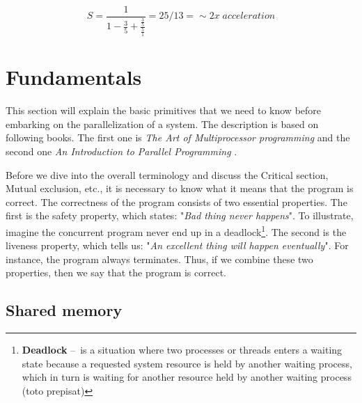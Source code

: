 \begin{equation}
    \label{eqn:amdalhinpractice}
    S = \frac{1}{1 - \frac{3}{5} + \frac{\frac{3}{5}}{\frac{5}{1}}} = 25/13 =\sim 2x \; acceleration
    \tag{2}
\end{equation}

\section{Fundamentals}

This section will explain the basic primitives that we need to know before embarking on the parallelization of a system. The description is based on following books. The first one is \emph{The Art of Multiprocessor programming} \cite{artOfMultiprocessorProgramming} and the second one \emph{An Introduction to Parallel Programming} \cite{introductionToParallelProgramming}.

Before we dive into the overall terminology and discuss the Critical section, Mutual exclusion, etc., it is necessary to know what it means that the program is correct. The correctness of the program consists of two essential properties. The first is the safety property, which states: "\emph{Bad thing never happens}". To illustrate, imagine the concurrent program never end up in a deadlock\footnote{\textbf{Deadlock} \---\ is a situation where two processes or threads enters a waiting state because a requested system resource is held by another waiting process, which in turn is waiting for another resource held by another waiting process (toto prepisat)}. The second is the liveness property, which tells us: "\emph{An excellent thing will happen eventually}". For instance, the program always terminates. Thus, if we combine these two properties, then we say that the program is correct.

\subsection{Shared memory}

